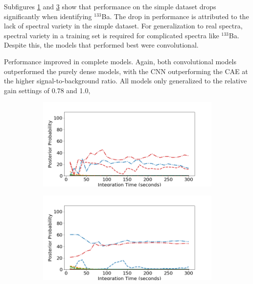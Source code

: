 Subfigures \ref{fig:realspectra-cal-ba133-0-easy} and \ref{fig:realspectra-cal-ba133-1-easy} show that performance on the simple dataset drops significantly when identifying $^{133}$Ba. The drop in performance is attributed to the lack of spectral variety in the simple dataset. For generalization to real spectra, spectral variety in a training set is required for complicated spectra like $^{133}$Ba. Despite this, the models that performed best were convolutional.

Performance improved in complete models. Again, both convolutional models outperformed the purely dense models, with the CNN outperforming the CAE at the higher signal-to-background ratio. All models only generalized to the relative gain settings of 0.78 and 1.0,  



\begin{figure}[H]
     \centering
     \begin{subfigure}[b]{0.49\textwidth}
         \centering
         \includegraphics[width=\textwidth]{images/realspectra-cal-ba133-0-easy.png}
         \caption{}
         \label{fig:realspectra-cal-ba133-0-easy}
     \end{subfigure}
     \hfill
     \begin{subfigure}[b]{0.49\textwidth}
         \centering
         \includegraphics[width=\textwidth]{images/realspectra-cal-ba133-1-easy.png}
         \caption{}
         \label{fig:realspectra-cal-ba133-1-easy}
     \end{subfigure}


\end{figure}
